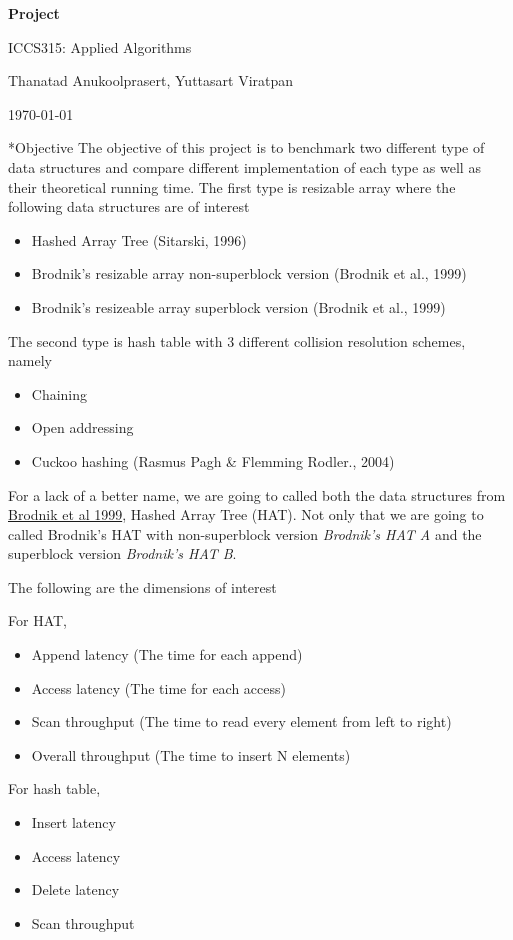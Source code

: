 \documentclass{article} %
\newcommand{\question}[2][]{\begin{flushleft}
                                \textbf{Question #1}: \textit{#2}

\end{flushleft}}
\newcommand{\maketitletwo}[2][]{\begin{center}
                                    \Large{\textbf{Project #1}

                                    ICCS315: Applied Algorithms} %
                                    \vspace{5pt}

                                    \normalsize{Thanatad Anukoolprasert, Yuttasart Viratpan   %

                                    \today}        %
                                    \vspace{15pt}
\end{center}}
\begin{document}
    \maketitletwo[]  %

    \section*{Objective}
    The objective of this project is to benchmark two different type of data structures and compare different
    implementation of each type as well as their theoretical running time.
    The first type is resizable array where the following data structures are of interest
    \begin{itemize}
        \item Hashed Array Tree (Sitarski, 1996)
        \item Brodnik's resizable array non-superblock version (Brodnik et al., 1999)
        \item Brodnik's resizeable array superblock version (Brodnik et al., 1999)
    \end{itemize}

    The second type is hash table with 3 different collision resolution schemes, namely
    \begin{itemize}
        \item Chaining
        \item Open addressing
        \item Cuckoo hashing (Rasmus Pagh \& Flemming Rodler., 2004)
    \end{itemize}

    For a lack of a better name, we are going to called both the data structures from \href{ https://sedgewick.io/wp-content/themes/sedgewick/papers/1999Optimal.pdf}{ Brodnik et al 1999}, Hashed Array Tree (HAT).
    Not only that we are going to called Brodnik's HAT with non-superblock version \emph{Brodnik's HAT A} and the superblock version \emph{Brodnik's HAT B}.

    The following are the dimensions of interest

    \noindent For HAT,
    \begin{itemize}
        \item Append latency (The time for each append)
        \item Access latency (The time for each access)
        \item Scan throughput (The time to read every element from left to right)
        \item Overall throughput (The time to insert N elements)
    \end{itemize}
    For hash table,
    \begin{itemize}
        \item Insert latency
        \item Access latency
        \item Delete latency
        \item Scan throughput  
    \end{itemize}
\end{document}
